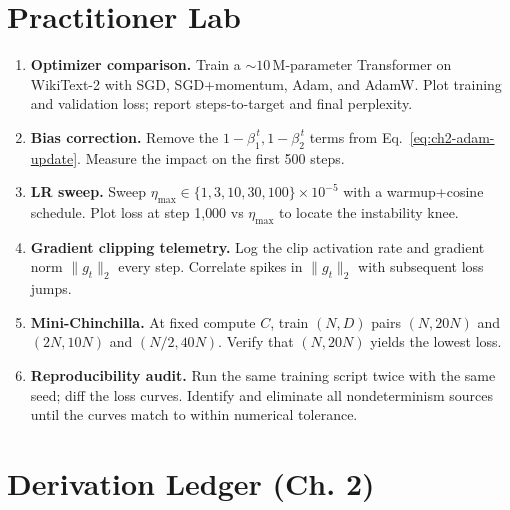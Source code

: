 \section{Practitioner Lab}

\begin{enumerate}
  \item \textbf{Optimizer comparison.} Train a $\sim\!10$\,M-parameter
        Transformer on WikiText-2 with SGD, SGD+momentum, Adam, and
        AdamW. Plot training and validation loss; report steps-to-target
        and final perplexity.
  \item \textbf{Bias correction.} Remove the
        $1-\beta_1^{\,t}, 1-\beta_2^{\,t}$ terms from
        Eq.~\eqref{eq:ch2-adam-update}. Measure the impact on the first
        500 steps.
  \item \textbf{LR sweep.} Sweep $\eta_{\max} \in \{1, 3, 10, 30, 100\}
        \times 10^{-5}$ with a warmup+cosine schedule. Plot loss at step
        1{,}000 vs $\eta_{\max}$ to locate the instability knee.
  \item \textbf{Gradient clipping telemetry.} Log the clip activation
        rate and gradient norm $\|g_t\|_2$ every step. Correlate spikes
        in $\|g_t\|_2$ with subsequent loss jumps.
  \item \textbf{Mini-Chinchilla.} At fixed compute $C$, train
        $(N, D)$ pairs $(N, 20 N)$ and $(2N, 10 N)$ and $(N/2, 40 N)$.
        Verify that $(N, 20 N)$ yields the lowest loss.
  \item \textbf{Reproducibility audit.} Run the same training script
        twice with the same seed; diff the loss curves. Identify and
        eliminate all nondeterminism sources until the curves match to
        within numerical tolerance.
\end{enumerate}

\section*{Derivation Ledger (Ch. 2)}


